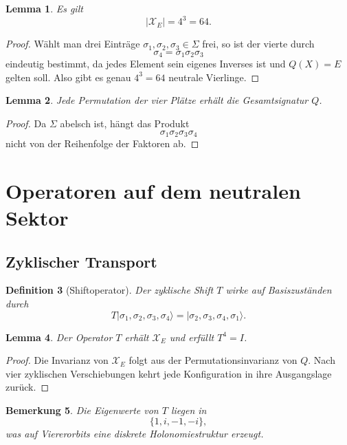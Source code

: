 \documentclass[11pt,a4paper]{article}
\newtheorem{definition}{Definition}[section]
\newtheorem{lemma}[definition]{Lemma}
\newtheorem{remark}[definition]{Bemerkung}
\newcommand{\X}{\mathcal X}
\begin{document}
	\begin{lemma}
		Es gilt
		\[
		|\X_E|=4^3=64.
		\]
	\end{lemma}
	
	\begin{proof}
		Wählt man drei Einträge \(\sigma_1,\sigma_2,\sigma_3\in\Sigma\) frei, so ist der vierte durch
		\[
		\sigma_4=\sigma_1\sigma_2\sigma_3
		\]
		eindeutig bestimmt, da jedes Element sein eigenes Inverses ist und \(Q(X)=E\) gelten soll. Also gibt es genau \(4^3=64\) neutrale Vierlinge.
	\end{proof}
	
	\begin{lemma}
		Jede Permutation der vier Plätze erhält die Gesamtsignatur \(Q\).
	\end{lemma}
	
	\begin{proof}
		Da \(\Sigma\) abelsch ist, hängt das Produkt
		\[
		\sigma_1\sigma_2\sigma_3\sigma_4
		\]
		nicht von der Reihenfolge der Faktoren ab.
	\end{proof}
	
	\section{Operatoren auf dem neutralen Sektor}
	
	\subsection{Zyklischer Transport}
	
	\begin{definition}[Shiftoperator]
		Der zyklische Shift \(T\) wirke auf Basiszuständen durch
		\[
		T|\sigma_1,\sigma_2,\sigma_3,\sigma_4\rangle
		=
		|\sigma_2,\sigma_3,\sigma_4,\sigma_1\rangle.
		\]
	\end{definition}
	
	\begin{lemma}
		Der Operator \(T\) erhält \(\X_E\) und erfüllt \(T^4=I\).
	\end{lemma}
	
	\begin{proof}
		Die Invarianz von \(\X_E\) folgt aus der Permutationsinvarianz von \(Q\). Nach vier zyklischen Verschiebungen kehrt jede Konfiguration in ihre Ausgangslage zurück.
	\end{proof}
	
	\begin{remark}
		Die Eigenwerte von \(T\) liegen in
		\[
		\{1,i,-1,-i\},
		\]
		was auf Viererorbits eine diskrete Holonomiestruktur erzeugt.
	\end{remark}
	
\end{document}
